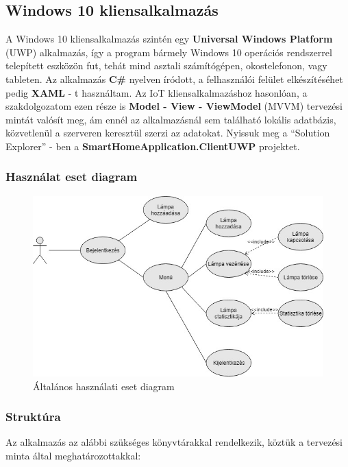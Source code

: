 \documentclass[a4paper,12pt]{report}
\begin{document}
 \subsection{Windows 10 kliensalkalmazás}
    A Windows 10 kliensalkalmazás szintén egy \textbf{Universal Windows Platform} (UWP) alkalmazás, így a program bármely Windows 10
    operációs rendszerrel telepített eszközön fut, tehát mind asztali számítógépen, okostelefonon, vagy tableten. Az alkalmazás \textbf{C\#} nyelven
    íródott, a felhasználói felület elkészítéséhet pedig \textbf{XAML} - t használtam. Az IoT kliensalkalmazáshoz hasonlóan, a szakdolgozatom
    ezen része is \textbf{Model - View - ViewModel} (MVVM) tervezési mintát valósít meg, ám ennél az alkalmazásnál sem található lokális
    adatbázis, közvetlenül a szerveren keresztül szerzi az adatokat. Nyissuk meg a ``Solution Explorer'' - ben a \textbf{SmartHomeApplication.ClientUWP}
    projektet.

\subsubsection{Használat eset diagram}

\begin{figure}[H]
    \centering
    \includegraphics[width=\linewidth]{images/usecase.jpg}
    \caption{Általános használati eset diagram}
    \label{fig: UseCase}
\end{figure}

 \subsubsection{Struktúra}
    Az alkalmazás az alábbi szükséges könyvtárakkal rendelkezik, köztük a tervezési minta által meghatározottakkal:
\end{document}

